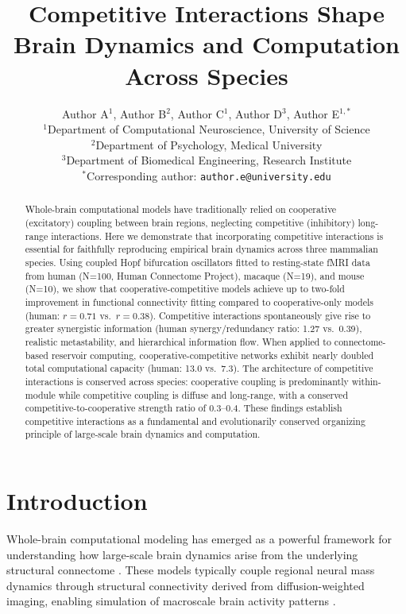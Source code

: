 \documentclass[11pt]{article}
\title{Competitive Interactions Shape Brain Dynamics and Computation Across Species}
\author{%
  Author A$^{1}$, Author B$^{2}$, Author C$^{1}$, Author D$^{3}$, Author E$^{1,*}$\\[6pt]
  $^{1}$Department of Computational Neuroscience, University of Science\\
  $^{2}$Department of Psychology, Medical University\\
  $^{3}$Department of Biomedical Engineering, Research Institute\\[4pt]
  $^{*}$Corresponding author: \texttt{author.e@university.edu}
}
\date{}
\begin{document}
\maketitle

\begin{abstract}
Whole-brain computational models have traditionally relied on cooperative (excitatory) coupling between brain regions, neglecting competitive (inhibitory) long-range interactions. Here we demonstrate that incorporating competitive interactions is essential for faithfully reproducing empirical brain dynamics across three mammalian species. Using coupled Hopf bifurcation oscillators fitted to resting-state fMRI data from human (N=100, Human Connectome Project), macaque (N=19), and mouse (N=10), we show that cooperative-competitive models achieve up to two-fold improvement in functional connectivity fitting compared to cooperative-only models (human: $r = 0.71$ vs.\ $r = 0.38$). Competitive interactions spontaneously give rise to greater synergistic information (human synergy/redundancy ratio: 1.27 vs.\ 0.39), realistic metastability, and hierarchical information flow. When applied to connectome-based reservoir computing, cooperative-competitive networks exhibit nearly doubled total computational capacity (human: 13.0 vs.\ 7.3). The architecture of competitive interactions is conserved across species: cooperative coupling is predominantly within-module while competitive coupling is diffuse and long-range, with a conserved competitive-to-cooperative strength ratio of 0.3--0.4. These findings establish competitive interactions as a fundamental and evolutionarily conserved organizing principle of large-scale brain dynamics and computation.
\end{abstract}

\section{Introduction}

Whole-brain computational modeling has emerged as a powerful framework for understanding how large-scale brain dynamics arise from the underlying structural connectome \citep{deco2011emerging, breakspear2017dynamic}. These models typically couple regional neural mass dynamics through structural connectivity derived from diffusion-weighted imaging, enabling simulation of macroscale brain activity patterns \citep{honey2009predicting, cabral2017functional}.
\end{document}

